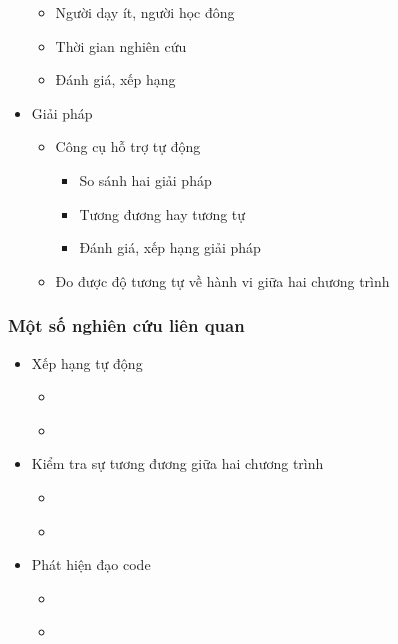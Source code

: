 \documentclass{beamer}
\begin{document}
\begin{frame}
\begin{minipage}{0.59\linewidth}
\begin{itemize}
      \begin{itemize}
      \item Người dạy ít, người học đông
      \item Thời gian nghiên cứu 
      \item Đánh giá, xếp hạng
      \end{itemize}
    \item Giải pháp
      \begin{itemize}
      \item Công cụ hỗ trợ tự động 
      	\begin{itemize}
      	\item So sánh hai giải pháp
      	\item Tương đương hay tương tự
      	\item Đánh giá, xếp hạng giải pháp
    	\end{itemize}
      \item Đo được độ tương tự về hành vi giữa hai chương trình 
      \end{itemize}
    \end{itemize}

  \end{minipage}
\end{frame}

\begin{frame}
  \frametitle{Một số nghiên cứu liên quan}
  \begin{itemize}
  \item Xếp hạng tự động
    \begin{itemize}
    \item \cite{alur2013automated}
    \item \cite{singh2013automated}
    \end{itemize}
  \item Kiểm tra sự tương đương giữa hai chương trình
    \begin{itemize}
    \item \cite{jackson1994semantic}
    \item \cite{jiang2009automatic}
    \end{itemize}
  \item Phát hiện đạo code
    \begin{itemize}
    \item \cite{baxter1998clone}
    \item \cite{komondoor2001using}
    \end{itemize}
  \end{itemize}

\end{frame}
\end{document}
